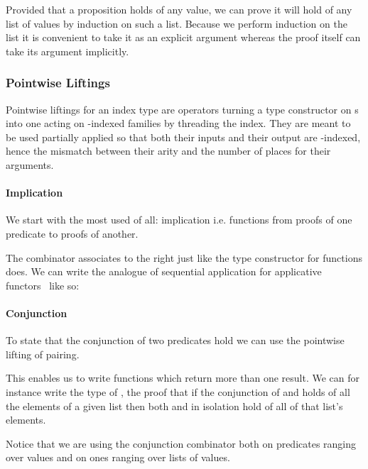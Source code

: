 Provided that a proposition holds of any value, we can prove it will hold
of any list of values by induction on such a list. Because we perform
induction on the list it is convenient to take it as an explicit argument
whereas the proof itself can take its argument implicitly.


\subsubsection{Pointwise Liftings}\label{sec:liftings}

Pointwise liftings for an index type  are operators turning a type
constructor on s into one acting on -indexed families by
threading the index. They are meant to be used partially applied so that
both their inputs and their output are -indexed, hence the mismatch
between their arity and the number of places for their arguments.

\paragraph{Implication} We start with the most used of all: implication
i.e. functions from proofs of one predicate to proofs of another.

The combinator  associates to the right just like the type
constructor for functions does. We can write the analogue of sequential
application for applicative functors~\cite{DBLP:journals/jfp/McbrideP08}
like so:

\paragraph{Conjunction} To state that the conjunction of two predicates hold
we can use the pointwise lifting of pairing.


This enables us to write functions which return more than one result. We can
for instance write the type of , the proof that if the conjunction
of  and  holds of all the elements of a given list then both
 and  in isolation hold of all of that list's elements.


Notice that we are using the conjunction combinator both on predicates ranging
over values and on ones ranging over lists of values.

